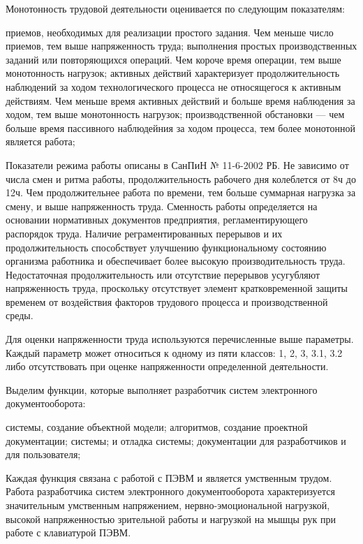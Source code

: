 \documentclass[14pt,a4paper]{reportmod}
\begin{document}
Монотонность трудовой деятельности оценивается по следующим показателям:
\begin{itemize}
  приемов, необходимых для реализации простого задания. Чем меньше число приемов, тем выше напряженность труда;
  выполнения простых производственных заданий или повторяющихся операций. Чем короче время операции, тем выше монотонность нагрузок;
  активных действий характеризует продолжительность наблюдений за ходом технологического процесса не относящегося к активным действиям. Чем  меньше время активных действий и больше время наблюдения за ходом, тем выше монотонность нагрузок;
  производственной обстановки — чем больше время пассивного наблюдейния за ходом процесса, тем более монотонной является работа;
\end{itemize}

Показатели режима работы описаны в СанПиН № 11-6-2002 РБ. Не зависимо от числа смен и ритма работы, продолжительность рабочего дня колеблется от 8ч до 12ч. Чем продолжительнее работа по времени, тем больше суммарная нагрузка за смену, и выше напряженность труда. Сменность работы определяется на основании нормативных документов предприятия, регламентирующего распорядок труда. Наличие реграментированных перерывов и их продолжительность способствует улучшению функциональному состоянию организма работника и обеспечивает более высокую производительность труда. Недостаточная продолжительность или отсутствие перерывов усугубляют напряженность труда, проскольку отсутствует элемент кратковременной защиты временем от воздействия факторов трудового процесса и производственной среды.

Для оценки напряженности труда используются перечисленные выше параметры. Каждый параметр может относиться к одному из пяти классов: 1, 2, 3, 3.1, 3.2 либо отсутствовать при оценке напряженности определенной деятельности.


Выделим функции, которые выполняет разработчик систем электронного документооборота:

\begin{itemize}
   системы, создание объектной модели;
   алгоритмов, создание проектной документации;
   системы;
   и отладка системы;
   документации для разработчиков и для пользователя;
\end{itemize}

Каждая  функция связана с работой с ПЭВМ и является умственным трудом. Работа разработчика систем электронного документооборота характеризуется значительным умственным напряжением, нервно-эмоциональной нагрузкой, высокой напряженностью зрительной работы и нагрузкой на мышцы рук при работе с клавиатурой ПЭВМ.
\end{document}
